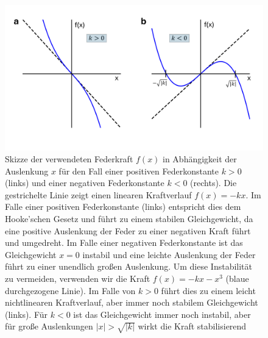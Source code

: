 \begin{figure}[H]
    \centering
    \includegraphics[width=0.8\linewidth]{bilder/kraft.pdf}
    \caption{Skizze der verwendeten Federkraft $f(x)$ in
    Abhängigkeit der Auslenkung $x$ für den Fall einer positiven
    Federkonstante $k>0$ (links) und einer negativen Federkonstante $k<0$
    (rechts). Die gestrichelte Linie zeigt einen linearen Kraftverlauf
    $f(x) = -kx$.  Im Falle einer positiven Federkonstante (links)
    entspricht dies dem Hooke'schen Gesetz und führt zu einem stabilen
    Gleichgewicht, da eine positive Auslenkung der Feder zu einer
    negativen Kraft führt und umgedreht. Im Falle einer negativen
    Federkonstante ist das Gleichgewicht $x=0$ instabil und eine leichte
    Auslenkung der Feder führt zu einer unendlich großen Auslenkung. Um
    diese Instabilität zu vermeiden, verwenden wir die Kraft $f(x) = -kx -
    x^3$ (blaue durchgezogene Linie). Im Falle von $k>0$ führt dies zu
    einem leicht nichtlinearen Kraftverlauf, aber immer noch stabilem
    Gleichgewicht (links). Für $k<0$ ist das Gleichgewicht immer noch
    instabil, aber für große Auslenkungen $|x| > \sqrt{|k|}$ wirkt die
    Kraft stabilisierend}
    \label{fig:force}
\end{figure}


